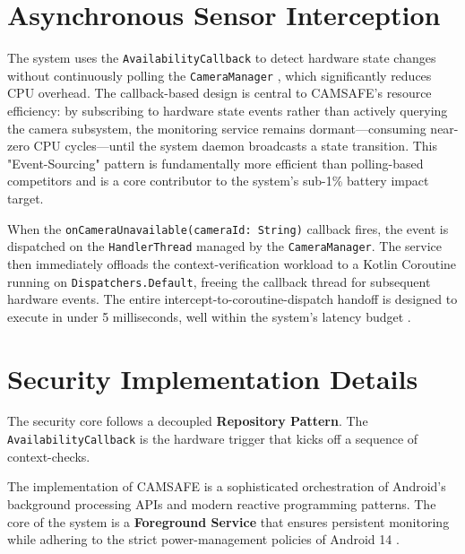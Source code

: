 \documentclass[12pt,a4paper]{report}
\begin{document}
\begin{enumerate}
    \section{Asynchronous Sensor Interception}
    The system uses the \texttt{AvailabilityCallback} to detect hardware state changes without continuously polling the \texttt{CameraManager} \cite{androidhal}, which significantly reduces CPU overhead. The callback-based design is central to CAMSAFE's resource efficiency: by subscribing to hardware state events rather than actively querying the camera subsystem, the monitoring service remains dormant—consuming near-zero CPU cycles—until the system daemon broadcasts a state transition. This "Event-Sourcing" pattern \cite{edgecomp} is fundamentally more efficient than polling-based competitors and is a core contributor to the system's sub-1\% battery impact target.

    When the \texttt{onCameraUnavailable(cameraId: String)} callback fires, the event is dispatched on the \texttt{HandlerThread} managed by the \texttt{CameraManager}. The service then immediately offloads the context-verification workload to a Kotlin Coroutine running on \texttt{Dispatchers.Default}, freeing the callback thread for subsequent hardware events. The entire intercept-to-coroutine-dispatch handoff is designed to execute in under 5 milliseconds, well within the system's latency budget \cite{androidhal}.

    \section{Security Implementation Details}
    The security core follows a decoupled \textbf{Repository Pattern}. The \texttt{AvailabilityCallback} is the hardware trigger that kicks off a sequence of context-checks.

    The implementation of CAMSAFE is a sophisticated orchestration of Android's background processing APIs and modern reactive programming patterns. The core of the system is a \textbf{Foreground Service} that ensures persistent monitoring while adhering to the strict power-management policies of Android 14 \cite{androidhal}.


\end{enumerate}
\end{document}

